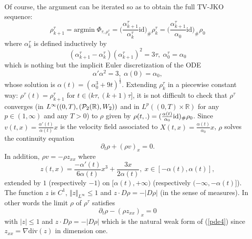 \documentclass[12pt, a4paper]{article}
\numberwithin{equation}{section}
\theoremstyle{plain}
\theoremstyle{definition}
\theoremstyle{remark}
\newcommand\PP{{\cal P}}
\newcommand{\R}{\mathbb{R}}
\newcommand{\id}{\mathrm{id}}
\newcommand{\dive}{\mathrm{div}}
\newcommand{\argmin}{\mathrm{argmin}}
\newcommand\pref[1]{(\ref{#1})}
\begin{document}
Of course, the argument can be iterated so as  to obtain the full TV-JKO sequence:
\[\rho_{k+1}^\tau=\argmin \;  \Phi_{\tau, \rho_k^\tau} =\Big(\frac{\alpha_{k+1}^\tau}{ \alpha_k^\tau } \id\Big)_\# \rho_k^\tau= \Big(\frac{\alpha_{k+1}^\tau}{ \alpha_0} \id\Big)_\# \rho_0\]
where $\alpha_k^\tau$ is defined inductively by
\[(\alpha_{k+1}^\tau-\alpha_k^\tau)(\alpha_{k+1}^\tau)^2=3 \tau, \; \alpha_0^\tau=\alpha_0\]
which is nothing but the implicit Euler discretization of the ODE
\[\alpha' \alpha^2=3, \; \alpha(0)=\alpha_0,\]
whose solution is $\alpha(t)=(\alpha_0^3+ 9t)^{\frac{1}{3}}$. Extending $\rho_{k}^\tau$ in a piecewise constant way: $\rho^\tau(t)=\rho_{k+1}^\tau$ for $t \in (k\tau, (k+1)\tau]$, it is not difficult to check that $\rho^\tau$ converges (in $L^{\infty}((0,T), (\PP_2(\R), W_2))$ and in $L^p((0,T)\times \R)$ for any $p\in (1, \infty)$ and any $T>0$) to $\rho$ given by $\rho(t,.)=(\frac{\alpha(t)}{\alpha_0} \rm{id})_\#\rho_0$. Since $v(t,x)=\frac{\alpha'(t)}{\alpha(t)} x$ is the velocity field associated to $X(t,x)=\frac{\alpha(t)}{\alpha_0}x$, $\rho$ solves the continuity equation
\[\partial_t \rho +(\rho v)_x=0.\]
In addition, $\rho v=-\rho z_{xx}$ where
\[ z(t,x)=\frac{-\alpha'(t)}{6 \alpha(t)} x^3+ \frac{ 3 x}{2\alpha(t)}, \; x\in[-\alpha(t), \alpha(t)],\]
extended by $1$ (respectively $-1$) on $[\alpha(t), +\infty)$ (respectively $(-\infty, -\alpha(t)]$). The function $z$  is $C^1$, $\Vert z \Vert_{L^\infty} \le 1$ and $z \cdot D \rho =-\vert D \rho\vert$ (in the sense of measures). In other words the limit $\rho$ of $\rho^\tau$ satisfies
\[\partial_t \rho-(\rho z_{xx})_x=0\]
with $\vert z \vert \le 1$ and $z \cdot D\rho =-\vert  D\rho\vert$ which is the natural weak form of \pref{pde4} since $z_{xx}=\nabla \dive(z)$  in dimension one.  
\end{document}
